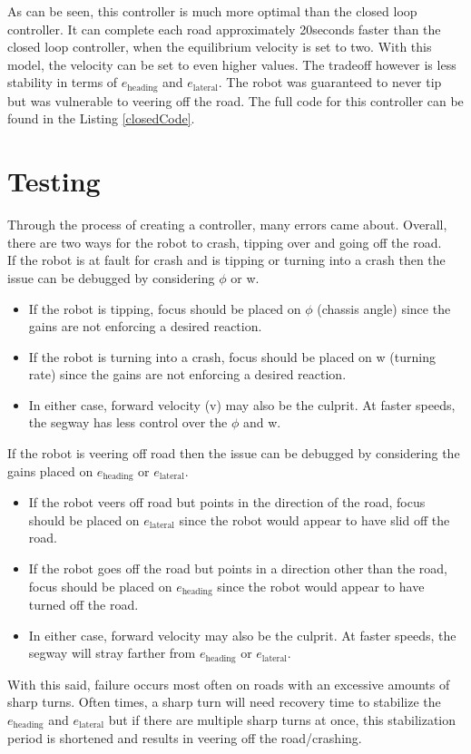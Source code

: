 \documentclass[12pt]{article}
\begin{document}
As can be seen, this controller is much more optimal than the closed loop controller. It can complete each road approximately 20seconds faster than the closed loop controller, when the equilibrium velocity is set to two. With this model, the velocity can be set to even higher values. The tradeoff however is less stability in terms of $e_\text{heading}$ and $e_\text{lateral}$. The robot was guaranteed to never tip but was vulnerable to veering off the road. The full code for this controller can be found in the Listing \ref{closedCode}.

\section{Testing}
Through the process of creating a controller, many errors came about. Overall, there are two ways for the robot to crash, tipping over and going off the road. 
\\
If the robot is at fault for crash and is tipping or turning into a crash then the issue can be debugged by considering $\phi$ or w.
\begin{itemize}
\item If the robot is tipping, focus should be placed on $\phi$ (chassis angle) since the gains are not enforcing a desired reaction.
\item If the robot is turning into a crash, focus should be placed on w (turning rate) since the gains are not enforcing a desired reaction.
\item In either case, forward velocity (v) may also be the culprit. At faster speeds, the segway has less control over the $\phi$ and w.
\end{itemize}
If the robot is veering off road then the issue can be debugged by considering the gains placed on $e_\text{heading}$ or $e_\text{lateral}$.
\begin{itemize}
\item If the robot veers off road but points in the direction of the road, focus should be placed on $e_\text{lateral}$ since the robot would appear to have slid off the road.
\item If the robot goes off the road but points in a direction other than the road, focus should be placed on $e_\text{heading}$ since the robot would appear to have turned off the road.
\item In either case, forward velocity may also be the culprit. At faster speeds, the segway will stray farther from $e_\text{heading}$ or $e_\text{lateral}$.
\end{itemize}
With this said, failure occurs most often on roads with an excessive amounts of sharp turns. Often times, a sharp turn will need recovery time to stabilize the $e_\text{heading}$ and $e_\text{lateral}$ but if there are multiple sharp turns at once, this stabilization period is shortened and results in veering off the road/crashing. 
\end{document}
